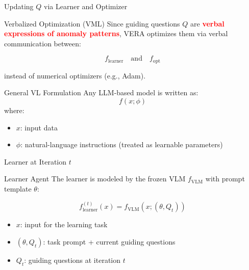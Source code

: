 \documentclass[aspectratio=169,xcolor=dvipsnames]{beamer}
\begin{document}
	
	
	\begin{frame}{Updating \(Q\) via Learner and Optimizer}
		\small
		
		\begin{block}{Verbalized Optimization (VML)}
			Since guiding questions \(Q\) are \textbf{\textcolor{red}{verbal expressions of anomaly patterns}},
			VERA optimizes them via verbal communication between:
			
			\[
			f_{\text{learner}} \quad \text{and} \quad f_{\text{opt}}
			\]
			
			instead of numerical optimizers (e.g., Adam).
		\end{block}
		
		\begin{block}{General VL Formulation}
			Any LLM-based model is written as:
			\[
			f(x; \phi)
			\]
			where:
			\begin{itemize}
				\item \(x\): input data
				\item \(\phi\): natural-language instructions (treated as learnable parameters)
			\end{itemize}
		\end{block}
		
		
	\end{frame}
	
	\begin{frame}{Learner at Iteration \(t\)}
		\small
		
		\begin{block}{Learner Agent}
			The learner is modeled by the frozen VLM \(f_{\text{VLM}}\)
			with prompt template \(\theta\):
			
			\[
			f^{(t)}_{\text{learner}}(x)
			=
			f_{\text{VLM}}(x; (\theta, Q_t))
			\]
			
			\begin{itemize}
				\item \(x\): input for the learning task
				\item \((\theta, Q_t)\): task prompt + current guiding questions
				\item \(Q_t\): guiding questions at iteration $t$
			\end{itemize}
		\end{block}
	\end{frame}
	
\end{document}
